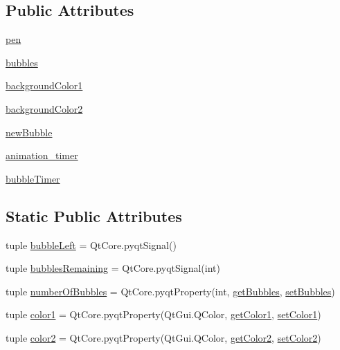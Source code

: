 \subsection*{Public Attributes}
\begin{DoxyCompactItemize}
\item 
\hyperlink{classbubbleswidget_1_1BubblesWidget_a1561b2b304c8d1b439c2f721f91fde9b}{pen}
\item 
\hyperlink{classbubbleswidget_1_1BubblesWidget_a04e33f09016a0abf1e5690311809d708}{bubbles}
\item 
\hyperlink{classbubbleswidget_1_1BubblesWidget_aea0c38b348b8c6c11c60fd6193995b57}{background\+Color1}
\item 
\hyperlink{classbubbleswidget_1_1BubblesWidget_ac775f1467573e06b9cf599de6a0068b6}{background\+Color2}
\item 
\hyperlink{classbubbleswidget_1_1BubblesWidget_a90d66f84e7e538e21bcea7878bcb6e1c}{new\+Bubble}
\item 
\hyperlink{classbubbleswidget_1_1BubblesWidget_aa3561dfe18c1028faa2139224ecc113c}{animation\+\_\+timer}
\item 
\hyperlink{classbubbleswidget_1_1BubblesWidget_a2a1d362e183548ef030641294765fb93}{bubble\+Timer}
\end{DoxyCompactItemize}
\subsection*{Static Public Attributes}
\begin{DoxyCompactItemize}
\item 
tuple \hyperlink{classbubbleswidget_1_1BubblesWidget_aec4294a1aeeae6864508c00038fcaac3}{bubble\+Left} = Qt\+Core.\+pyqt\+Signal()
\item 
tuple \hyperlink{classbubbleswidget_1_1BubblesWidget_a7c36b5f131a8d38b962d69c78a82ffc9}{bubbles\+Remaining} = Qt\+Core.\+pyqt\+Signal(int)
\item 
tuple \hyperlink{classbubbleswidget_1_1BubblesWidget_aee55ee7a16570d2877c0a9ae6164a938}{number\+Of\+Bubbles} = Qt\+Core.\+pyqt\+Property(int, \hyperlink{classbubbleswidget_1_1BubblesWidget_a68ceb69ffde51f2e1c0adc6906de81ef}{get\+Bubbles}, \hyperlink{classbubbleswidget_1_1BubblesWidget_a40c57d46e2184af9490f2785f46867f6}{set\+Bubbles})
\item 
tuple \hyperlink{classbubbleswidget_1_1BubblesWidget_a3cc34d04b6a1d6c918227173ace8684c}{color1} = Qt\+Core.\+pyqt\+Property(Qt\+Gui.\+Q\+Color, \hyperlink{classbubbleswidget_1_1BubblesWidget_a98ef89f436d46c684641a610a6d808ca}{get\+Color1}, \hyperlink{classbubbleswidget_1_1BubblesWidget_ad0af0ef49ad102f012aed60a8bbe248e}{set\+Color1})
\item 
tuple \hyperlink{classbubbleswidget_1_1BubblesWidget_a155f3b9c732136cce6c7d7c1438cc797}{color2} = Qt\+Core.\+pyqt\+Property(Qt\+Gui.\+Q\+Color, \hyperlink{classbubbleswidget_1_1BubblesWidget_a30f52038baa9e258b1abd44ae32bb3f2}{get\+Color2}, \hyperlink{classbubbleswidget_1_1BubblesWidget_a1064534ca67076a7fe70c34ef7033ded}{set\+Color2})
\end{DoxyCompactItemize}


